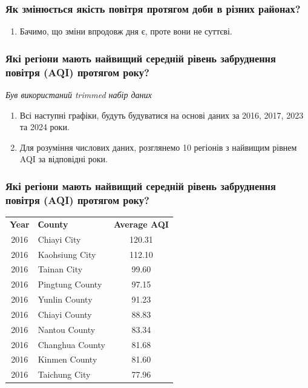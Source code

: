 \documentclass{beamer}
\begin{document}
\begin{frame}
  \frametitle{Як змінюється якість повітря протягом доби в різних районах?}

  \begin{enumerate}
    \item Бачимо, що зміни впродовж дня є, проте вони не суттєві.
  \end{enumerate}
\end{frame}


\begin{frame}
  \frametitle{Які регіони мають найвищий середній рівень забруднення повітря (AQI) протягом року?}

  \textit{Був використаний trimmed набір даних}

  \begin{enumerate}
    \item Всі наступні графіки, будуть будуватися на основі даних за
    2016, 2017, 2023 та 2024 роки.
    \item  Для розуміння числових даних, розглянемо 10 регіонів з
    найвищим рівнем AQI за відповідні роки.
  \end{enumerate}
\end{frame}

\begin{frame}
  \frametitle{Які регіони мають найвищий середній рівень забруднення повітря (AQI) протягом року?}

  \begin{center}
    \begin{tabular}{clc}
      \textbf{Year} & \textbf{Сounty} & \textbf{Average AQI} \\
      2016 & Chiayi City     & 120.31 \\
      2016 & Kaohsiung City  & 112.10 \\
      2016 & Tainan City     & 99.60  \\
      2016 & Pingtung County & 97.15  \\
      2016 & Yunlin County   & 91.23  \\
      2016 & Chiayi County   & 88.83  \\
      2016 & Nantou County   & 83.34  \\
      2016 & Changhua County & 81.68  \\
      2016 & Kinmen County   & 81.60  \\
      2016 & Taichung City   & 77.96  \\
    \end{tabular}
  \end{center}
\end{frame}
\end{document}
